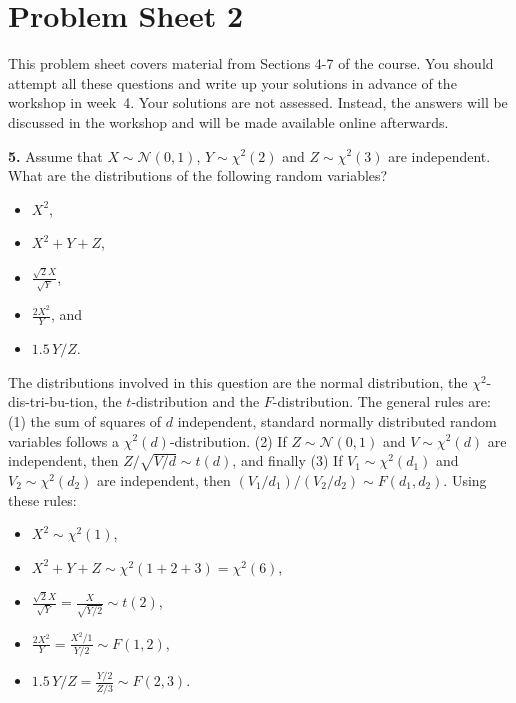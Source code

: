 \documentclass[
  a4paper,
]{article}
\theoremstyle{definition}
\theoremstyle{definition}
\theoremstyle{definition}
\theoremstyle{definition}
\theoremstyle{remark}
\begin{document}
\clearpage

\section*{Problem Sheet 2}\label{P02}


This problem sheet covers material from Sections 4-7 of the course. You should
attempt all these questions and write up your solutions in advance of the
workshop in week~4. Your solutions are not assessed. Instead, the answers
will be discussed in the workshop and will be made available online afterwards.

\textbf{5.} Assume that \(X \sim \mathcal{N}(0, 1)\), \(Y\sim \chi^2(2)\) and
\(Z \sim \chi^2(3)\) are independent. What are the distributions of
the following random variables?

\begin{itemize}
\item
  \(X^2\),
\item
  \(X^2 + Y + Z\),
\item
  \(\displaystyle\frac{\sqrt{2}X}{\sqrt{Y}}\),
\item
  \(\displaystyle\frac{2X^2}{Y}\), and
\item
  \(1.5\, Y/Z\).
\end{itemize}

\begin{myanswers}

The distributions involved in this question are the normal
distribution, the \(\chi^2\)-dis-tri-bu-tion, the \(t\)-distribution
and the \(F\)-distribution. The general rules are: (1) the sum of
squares of \(d\) independent, standard normally distributed random
variables follows a \(\chi^2(d)\)-distribution. (2) If
\(Z\sim\mathcal{N}(0,1)\) and \(V \sim \chi^2(d)\) are independent, then
\(Z / \sqrt{V / d} \sim t(d)\), and finally (3) If
\(V_1\sim \chi^2(d_1)\) and \(V_2\sim \chi^2(d_2)\) are independent,
then \((V_1/d_1)/(V_2/d_2) \sim F(d_1, d_2)\). Using these rules:

\begin{itemize}
\item
  \(X^2 \sim \chi^2(1)\),
\item
  \(X^2 + Y + Z \sim \chi^2(1+2+3) =  \chi^2(6)\),
\item
  \(\displaystyle\frac{\sqrt{2}X}{\sqrt{Y}} = \frac{X}{\sqrt{Y/2}} \sim  t(2)\),
\item
  \(\displaystyle\frac{2X^2}{Y} = \frac{X^2/1}{Y/2} \sim F(1,2)\),
\item
  \(\displaystyle 1.5\, Y/Z = \frac{Y/2}{Z/3} \sim F(2, 3)\).
\end{itemize}

\end{myanswers}
\end{document}
